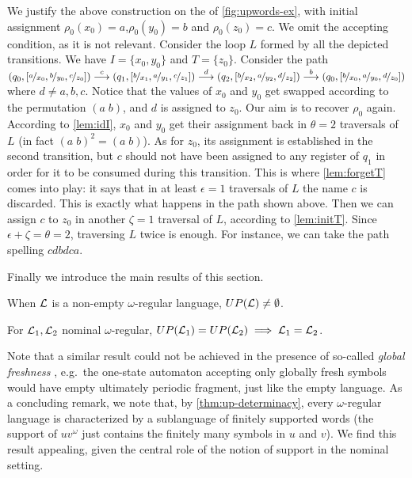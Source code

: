 \begin{example} We justify the above construction on the \hdma{} of \cref{fig:upwords-ex}, with initial assignment $\rho_0(x_0) = a$,$\rho_0(y_0) = b$ and $\rho_0(z_0) = c$. We omit the accepting condition, as it is not relevant. Consider the loop $L$ formed by all the depicted transitions.
We have $I = \{x_0,y_0\}$ and $T = \{z_0\}$. Consider the path
$	(q_0,[\nicefrac{a}{x_0},\nicefrac{b}{y_0},\nicefrac{c}{z_0}]) \overset{c}{\longrightarrow} (q_1,[\nicefrac{b}{x_1},\nicefrac{a}{y_1},\nicefrac{c}{z_1}]) \overset{d}{\longrightarrow} (q_2,[\nicefrac{b}{x_2},\nicefrac{a}{y_2},\nicefrac{d}{z_2}])
	\overset{b}{\longrightarrow} (q_0,[\nicefrac{b}{x_0},\nicefrac{a}{y_0},\nicefrac{d}{z_0}])$
%
where $d \neq a,b,c$. Notice that the values of $x_0$ and $y_0$ get swapped according to the permutation $(a \; b)$, and $d$ is assigned to $z_0$. Our aim is to recover $\rho_0$ again. According to \cref{lem:idI}, $x_0$ and $y_0$ get their assignment back in $\theta = 2$ traversals of $L$ (in fact $(a\; b)^2 = (a\; b)$). As for $z_0$, its assignment is established in the second transition, but $c$ should not have been assigned to any register of $q_1$ in order for it to be consumed during this transition. This is where \cref{lem:forgetT} comes into play: it says that in at least $\epsilon = 1$ traversals of $L$ the name $c$ is discarded. This is exactly what happens in the path shown above. Then we can assign $c$ to $z_0$ in another $\zeta = 1$ traversal of $L$, according to \cref{lem:initT}. Since $\epsilon + \zeta  = \theta = 2$, traversing $L$ twice is enough. For instance, we can take the path spelling $cdbdca$.
\end{example}
%
\noindent Finally we introduce the main results of this section.
%
\begin{theorem}
\label{thm:up-fragment}
When $\mathcal{L}$ is a non-empty $\omega$-regular language, $UP(\mathcal{L}) \neq \emptyset$.
\end{theorem}

\begin{theorem}
\label{thm:up-determinacy}
For $\mathcal{L}_1,\mathcal{L}_2$ nominal $\omega$-regular, $UP(\mathcal{L}_1) = UP(\mathcal{L}_2) \implies\mathcal{L}_1 = \mathcal{L}_2$.
\end{theorem}
% 
Note that a similar result could not be achieved in the presence of so-called \emph{global freshness} \cite{Tze11}, e.g.\ the one-state automaton accepting only globally fresh symbols would have empty ultimately periodic fragment, just like the empty language. As a concluding remark, we note that, by \cref{thm:up-determinacy}, every $\omega$-regular language is characterized by a sublanguage of finitely supported words (the support of $uv^\omega$ just contains the finitely many symbols in $u$ and $v$). We find this result appealing, given the central role of the notion of support in the nominal setting. 

